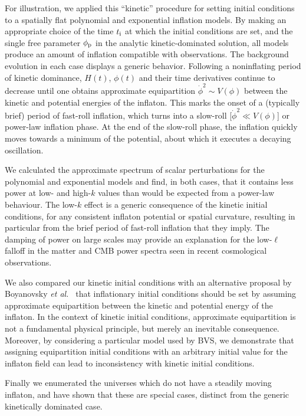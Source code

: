 For illustration, we applied this ``kinetic'' procedure for setting
initial conditions to a spatially flat polynomial and exponential
inflation models.  By making an appropriate choice of the time $t_{\mathrm{i}}$
at which the initial conditions are set, and the single free parameter
$\phi_{\mathrm{p}}$ in the analytic kinetic-dominated solution, all models produce
an amount of inflation compatible with observations.  The background
evolution in each case displays a generic behavior.  Following a
noninflating period of kinetic dominance, $H(t)$, $\phi(t)$ and their
time derivatives continue to decrease until one obtains approximate
equipartition $\dot{\phi}^2 \sim V(\phi)$ between the kinetic and
potential energies of the inflaton. This marks the onset of a
(typically brief) period of fast-roll inflation, which turns into a
slow-roll [$\dot{\phi}^2 \ll V(\phi)$] or power-law inflation phase.
At the end of the slow-roll phase, the inflation quickly moves towards
a minimum of the potential, about which it executes a decaying
oscillation.

We calculated the approximate spectrum of scalar perturbations
for the polynomial and exponential models and find, in both cases,
that it contains less power at low- and high-$k$ values than would be
expected from a power-law behaviour. The low-$k$ effect is a
generic consequence of the kinetic initial conditions, for any
consistent inflaton potential or spatial curvature, resulting in
particular from the brief period of fast-roll inflation that they
imply.  The damping of power on large scales may provide an
explanation for the low-$\ell$ falloff in the matter and CMB power
spectra seen in recent cosmological observations.

We also compared our kinetic initial conditions with an alternative
proposal by Boyanovsky {\it et al.\ }
\citep{boyanovsky_cmb_2006} that inflationary initial conditions
should be set by assuming approximate equipartition between the
kinetic and potential energy of the inflaton.  In the context of
kinetic initial conditions, approximate equipartition is not a
fundamental physical principle, but merely an inevitable consequence.
Moreover, by considering a particular model used by BVS, we
demonstrate that assigning equipartition initial conditions with an
arbitrary initial value for the inflaton field can lead to
inconsistency with kinetic initial conditions.

Finally we enumerated the universes which do not have a steadily
moving inflaton, and have shown that these are special cases, distinct
from the generic kinetically dominated case.

